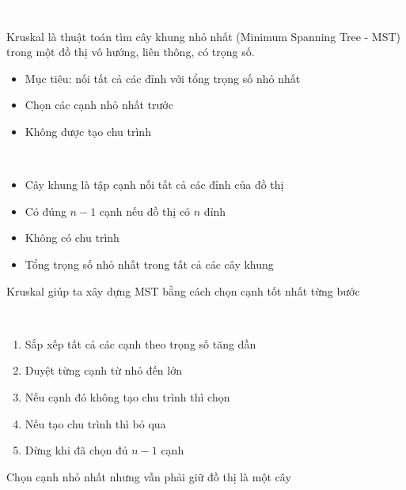 \documentclass{beamer}
\title{\hlred{Kruskal Algorithm}}
\author{Group 3}
\date{\hlcyan{03/2026}}
\newcommand{\hlblue}[1]{\textcolor{myblue}{#1}}
\newcommand{\hlgreen}[1]{\textcolor{mygreen}{#1}}
\newcommand{\hlred}[1]{\textcolor{myred}{#1}}
\newcommand{\hlpurple}[1]{\textcolor{mypurple}{#1}}
\newcommand{\hlwhite}[1]{\textcolor{white}{#1}}
\begin{document}
\frame{\titlepage}


\begin{frame}{\hlwhite{Định nghĩa}}
\begin{tcolorbox}[title=\textbf{\hlwhite{Kruskal là gì?}}]
\hlblue{Kruskal} là thuật toán tìm \hlgreen{cây khung nhỏ nhất} \hlpurple{(Minimum Spanning Tree - MST)}
trong một đồ thị vô hướng, liên thông, có trọng số.
\end{tcolorbox}

\begin{itemize}
\item Mục tiêu: nối tất cả các đỉnh với tổng trọng số nhỏ nhất
\item Chọn các cạnh \hlred{nhỏ nhất trước}
\item Không được tạo chu trình
\end{itemize}
\end{frame}


\begin{frame}{\hlwhite{Cây khung nhỏ nhất là gì?}}
\begin{itemize}
\item \hlblue{Cây khung} là tập cạnh nối tất cả các đỉnh của đồ thị
\item Có đúng $n-1$ cạnh nếu đồ thị có $n$ đỉnh
\item \hlred{Không có chu trình}
\item \hlgreen{Tổng trọng số nhỏ nhất} trong tất cả các cây khung
\end{itemize}

\begin{tcolorbox}
\centering
\hlpurple{Kruskal giúp ta xây dựng MST bằng cách chọn cạnh tốt nhất từng bước}
\end{tcolorbox}
\end{frame}


\begin{frame}{\hlwhite{Ý tưởng của Kruskal}}
\begin{enumerate}
\item Sắp xếp tất cả các cạnh theo trọng số tăng dần
\item Duyệt từng cạnh từ nhỏ đến lớn
\item Nếu cạnh đó \hlgreen{không tạo chu trình} thì chọn
\item Nếu tạo chu trình thì bỏ qua
\item Dừng khi đã chọn đủ $n-1$ cạnh
\end{enumerate}

\begin{tcolorbox}
\centering
\hlred{Chọn cạnh nhỏ nhất nhưng vẫn phải giữ đồ thị là một cây}
\end{tcolorbox}
\end{frame}
\end{document}
